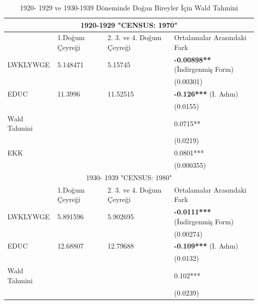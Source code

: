 \documentclass[12pt, a4paper, showtrims]{article}
\begin{document}
\begin{justify}
\begin{justify}
    \begin{table}[h]
        \centering
        \caption{1920- 1929 ve 1930-1939 Döneminde Doğan Bireyler İçin Wald Tahmini}
        \begin{tabular}{|p{3cm}||p{2cm}|p{2cm}|p{6cm}|}   
            \hline
            \multicolumn{4}{|c|}{1920-1929 "CENSUS: 1970"} \\
            \hline
         \hline
                   & 1.Doğum Çeyreği & 2. 3. ve 4. Doğum Çeyreği & Ortalamalar Arasındaki Fark \\ [0.5ex] 
         \hline
          LWKLYWGE &  5.148471       &   5.15745                 &  \textbf{-0.00898**} (İndirgenmiş Form) \\ 
                   &                 &                           &      (0.00301)  \\
          EDUC     & 11.3996         &   11.52515                &  \textbf{ -0.126***} (I. Adım) \\ 
                   &                 &                           &      (0.0155)  \\ 
          Wald Tahmini &             &                           &  0.0715** \\ 
                   &                 &                           & (0.0219) \\ 
          EKK      &                 &                           &  0.0801***\\ 
                   &                 &                           & (0.000355)  \\  
        \hline
        \multicolumn{4}{|c|}{1930- 1939 "CENSUS: 1980"} \\
        \hline
        \hline
                  & 1.Doğum Çeyreği & 2. 3. ve 4. Doğum Çeyreği & Ortalamalar Arasındaki Fark \\ [0.5ex] 
        \hline
         LWKLYWGE &  5.891596       & 5.902695                  &  \textbf{-0.0111***} (İndirgenmiş Form) \\ 
                  &                 &                           & (0.00274)  \\
         EDUC     & 12.68807        & 12.79688                  &  \textbf{-0.109***} (I. Adım) \\ 
                  &                 &                           & (0.0132)  \\ 
         Wald Tahmini &             &                           &   0.102*** \\ 
                  &                 &                           & (0.0239) \\ 

\end{tabular}
\end{table}
\end{justify}
\end{justify}
\end{document}
